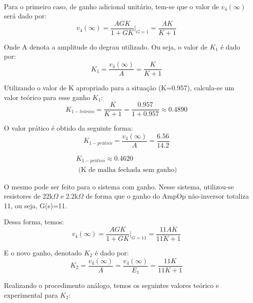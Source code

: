 \paragraph{}
Para o primeiro caso, de ganho adicional unitário, tem-se que o valor de $v_4(\infty)$ será dado por:
\begin{equation}
v_4(\infty)=\frac{AGK}{1+GK}|_{G=1}=\frac{AK}{K+1}
\end{equation}

Onde A denota a amplitude do degrau utilizado. Ou seja, o valor de $K_1$ é dado por:\\
\begin{equation}
K_1=\frac{v_4(\infty)}{A}=\frac{K}{K+1}
\end{equation}

Utilizando o valor de K apropriado para a situação (K=0.957), calcula-se um valor teórico para esse ganho $K_1$:
\begin{equation}
\boxed{K_{1 - teórico}=\frac{K}{K+1}=\frac{0.957}{1+0.957}\approx 0.4890}
\end{equation}


O valor prático é obtido da seguinte forma:
\begin{equation}
K_{1 - prático}=\frac{v_4(\infty)}{A}=\frac{6.56}{14.2}
\end{equation}

\begin{equation}
\begin{array}{c}
\boxed{K_{1 - prático} \approx 0.4620} \\ \mbox{ (K de malha fechada sem ganho)}
\end{array}
\end{equation}

O mesmo pode ser feito para o sistema com ganho. Nesse sistema, utilizou-se resistores de 22k$\Omega$ e 2.2k$\Omega$ de forma que o ganho do AmpOp não-inversor totaliza 11, ou seja, G(s)=11.

Dessa forma, temos:\\
\begin{equation}
v_4(\infty)=\frac{AGK}{1+GK}|_{G=11}=\frac{11AK}{11K+1}
\end{equation}

E o novo ganho, denotado $K_2$ é dado por:\\
\begin{equation}
K_2=\frac{v_4(\infty)}{A}=\frac{v_4(\infty)}{E_1}=\frac{11K}{11K+1}
\end{equation}

Realizando o procedimento análogo, temos os seguintes valores teórico e experimental para $K_2$:

